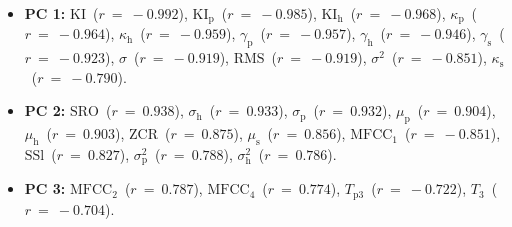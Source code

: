 \begin{itemize}
	\item {\bf{PC 1:}} $\textrm{KI}$~($r~=~-0.992$), $\textrm{KI}_{\textrm{p}}$~($r~=~-0.985$), $\textrm{KI}_{\textrm{h}}$~($r~=~-0.968$), $\kappa_{\textrm{p}}$~($r~=~-0.964$), $\kappa_{\textrm{h}}$~($r~=~-0.959$), $\gamma_{\textrm{p}}$~($r~=~-0.957$), $\gamma_{\textrm{h}}$~($r~=~-0.946$), $\gamma_{\textrm{s}}$~($r~=~-0.923$), $\sigma$~($r~=~-0.919$), $\textrm{RMS}$~($r~=~-0.919$), $\sigma^{2}$~($r~=~-0.851$), $\kappa_{\textrm{s}}$~($r~=~-0.790$).
	\item {\bf{PC 2:}} $\textrm{SRO}$~($r~=~ 0.938$), $\sigma_{\textrm{h}}$~($r~=~ 0.933$), $\sigma_{\textrm{p}}$~($r~=~ 0.932$), $\mu_{\textrm{p}}$~($r~=~ 0.904$), $\mu_{\textrm{h}}$~($r~=~ 0.903$), $\textrm{ZCR}$~($r~=~ 0.875$), $\mu_{\textrm{s}}$~($r~=~ 0.856$), $\textrm{MFCC}_{1}$~($r~=~-0.851$), $\textrm{SSl}$~($r~=~ 0.827$), $\sigma_{\textrm{p}}^{2}$~($r~=~ 0.788$), $\sigma_{\textrm{h}}^{2}$~($r~=~ 0.786$).
	\item {\bf{PC 3:}} $\textrm{MFCC}_{2}$~($r~=~ 0.787$), $\textrm{MFCC}_{4}$~($r~=~ 0.774$), $T_{\textrm{p}3}$~($r~=~-0.722$), $T_{3}$~($r~=~-0.704$).
\end{itemize}
